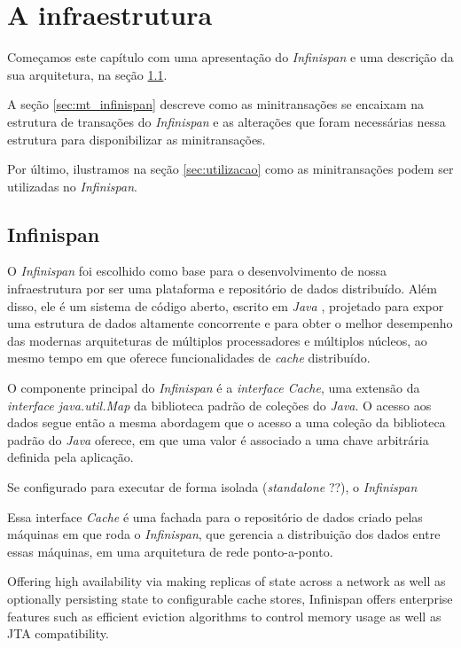 \documentclass[11pt,twoside,a4paper]{book}
\begin{document}
\chapter{A infraestrutura}
\label{chap:implementacao}
Começamos este capítulo com uma apresentação do \emph{Infinispan} e uma
descrição da sua arquitetura, na seção \ref{sec:infinispan}. 

A seção \ref{sec:mt_infinispan} descreve como as minitransações se
encaixam na estrutura de transações do \emph{Infinispan} e as alterações que
foram necessárias nessa estrutura para disponibilizar as minitransações.

Por último, ilustramos na seção \ref{sec:utilizacao} como as minitransações
podem ser utilizadas no \emph{Infinispan}.

\section{Infinispan}
\label{sec:infinispan}
O \emph{Infinispan} foi escolhido como base para o desenvolvimento de nossa
infraestrutura por ser uma plataforma e repositório de dados distribuído. Além
disso, ele é um sistema de código aberto, escrito em \emph{Java} \cite{java},
projetado para expor uma estrutura de dados altamente concorrente e para obter o
melhor desempenho das modernas arquiteturas de múltiplos processadores e
múltiplos núcleos, ao mesmo tempo em que oferece funcionalidades de \emph{cache}
distribuído.

O componente principal do \emph{Infinispan} é a \emph{interface Cache}, uma extensão 
da \emph{interface java.util.Map} da biblioteca padrão de coleções do \emph{Java}. 
O acesso aos dados segue então a mesma abordagem que o acesso a uma coleção da biblioteca
padrão do \emph{Java} oferece, em que uma valor é associado a uma chave arbitrária definida
pela aplicação.

Se configurado para executar de forma isolada (\emph{standalone} ??), o \emph{Infinispan}


Essa interface \emph{Cache} é uma fachada para o repositório
de dados criado pelas máquinas em que roda o \emph{Infinispan}, que gerencia a distribuição 
dos dados entre essas máquinas, em uma arquitetura de rede ponto-a-ponto.  

Offering high availability via making replicas of state across a network as well as optionally persisting state to 
configurable cache stores, Infinispan offers enterprise features such as efficient eviction algorithms to control memory 
usage as well as JTA compatibility.
\end{document}
